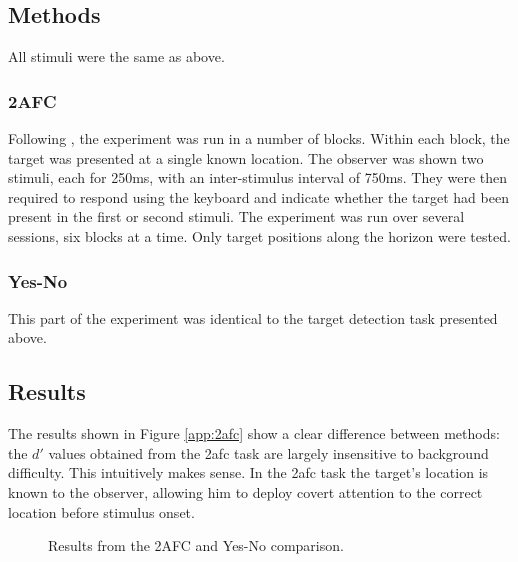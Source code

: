 \documentclass[man]{apa6}
\begin{document}
\subsection{Methods}

All stimuli were the same as above. 

\subsubsection{2AFC}

Following \textcite{najemnik-geisler2005, najemnik-geisler2008}, the experiment was run in a number of blocks. Within each block, the target was presented at a single known location. The observer was shown two stimuli, each for 250ms, with an inter-stimulus interval of 750ms. They were then required to respond using the keyboard and indicate whether the target had been present in the first or second stimuli. The experiment was run over several sessions, six blocks at a time. Only target positions along the horizon were tested. 

\subsubsection{Yes-No}

This part of the experiment was identical to the target detection task presented above. 

\subsection{Results}

The results shown in Figure \ref{app:2afc} show a clear difference between methods: the $d'$ values obtained from the 2afc task are largely insensitive to background difficulty. This intuitively makes sense. In the 2afc task the target's location is known to the observer, allowing him to deploy covert attention to the correct location before stimulus onset.  

\begin{figure}
	\centering
	\caption{Results from the 2AFC and Yes-No comparison.} 
	\label{fig:2afcResults}	
\end{figure}
\end{document}
